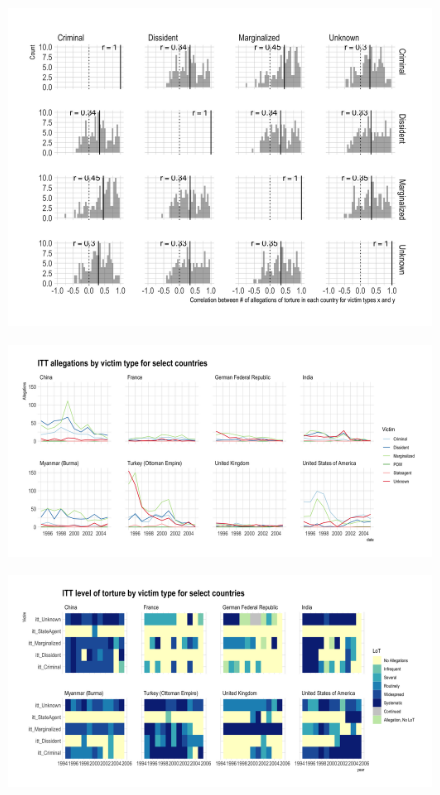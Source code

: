\documentclass[12pt]{article}
\begin{document}
\begin{figure}
\includegraphics[width=.9\textwidth]{../output/figures/allegations-by-victim-pairwise-correlations.png}
\end{figure}

\begin{figure}
\includegraphics[width=.9\textwidth]{../output/figures/selected-allegation-counts.png}
\end{figure}

\begin{figure}
\includegraphics[width=.9\textwidth]{../output/figures/selected-levels-of-torture.png}
\end{figure}
\end{document}
